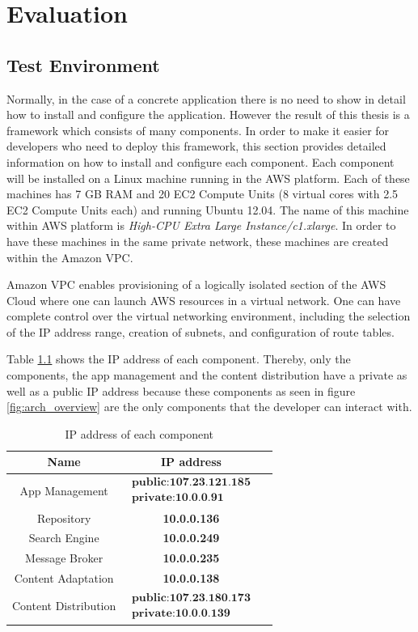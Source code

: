 \chapter{Evaluation\label{cha:chapter6}}


\section{Test Environment\label{sec:eval_te_en}}
Normally, in the case of a concrete application there is no need to show in detail how to install and configure the application. However the result of this thesis is a framework which consists of many components. In order to make it easier for developers who need to deploy this framework, this section provides detailed information on how to install and configure each component. Each component will be installed on a Linux machine running in the \ac{AWS} platform. Each of these machines has 7 GB RAM and 20 \ac{EC2} Compute Units (8 virtual cores with 2.5 \ac{EC2} Compute Units each) and running Ubuntu 12.04. The name of this machine within \ac{AWS} platform is \textit{High-CPU Extra Large Instance/c1.xlarge}. In order to have these machines in the same private network, these machines are created within the Amazon \ac{VPC}. 

Amazon \ac{VPC} enables provisioning of a logically isolated section of the AWS Cloud where one can launch AWS resources in a virtual network. One can have complete control over the virtual networking environment, including the selection of the IP address range, creation of subnets, and configuration of route tables.

Table \ref{tbl:ap_addresses} shows the IP address of each component. Thereby, only the components, the app management and the content distribution have a private as well as a public IP address because these components as seen in figure \ref{fig:arch_overview} are the only components that the developer can interact with. 

\begin{table}[htb]
\begin{tabular}{|c|c|c|}
\hline 
Name & IP address \\ 
\hline 
App Management & $\begin{array}{l} \textbf{public:107.23.121.185} \\ \textbf{private:10.0.0.91}  \end{array}$ \\ 
\hline 
Repository & \textbf{10.0.0.136} \\ 
\hline 
Search Engine & \textbf{10.0.0.249} \\ 
\hline
Message Broker & \textbf{10.0.0.235} \\ 
\hline
Content Adaptation & \textbf{10.0.0.138} \\ 
\hline
Content Distribution & $\begin{array}{l} \textbf{public:107.23.180.173} \\ \textbf{private:10.0.0.139}  \end{array}$ \\ 
\hline
\end{tabular} 
\caption{IP address of each component}
\label{tbl:ap_addresses}
\end{table} 


